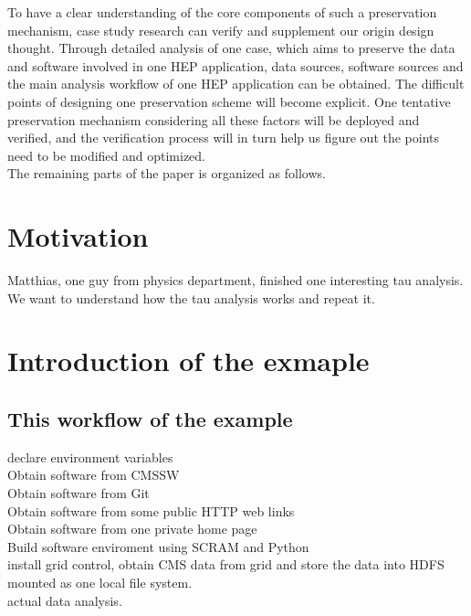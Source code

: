 \documentclass{article}
\begin{document}
To have a clear understanding of the core components of such a preservation mechanism, case study research can verify and supplement our origin design thought. Through detailed analysis of one case, which aims to preserve the data and software involved in one HEP application, data sources, software sources and the main analysis workflow of one HEP application can be obtained. The difficult points of designing one preservation scheme will become explicit. One tentative preservation mechanism considering all these factors will be deployed and verified, and the verification process will in turn help us figure out the points need to be modified and optimized.\\

The remaining parts of the paper is organized as follows. 

\section{Motivation}

\indent Matthias, one guy from physics department, finished one interesting tau analysis. We want to understand how the tau analysis works and repeat it. 

\section{Introduction of the exmaple}
\subsection{This workflow of the example}
\indent declare environment variables\\

Obtain software from CMSSW\\

Obtain software from Git\\

Obtain software from some public HTTP web links\\

Obtain software from one private home page\\

Build software enviroment using SCRAM and Python\\

install grid control, obtain CMS data from grid and store the data into HDFS mounted as one local file system.\\

actual data analysis.
\end{document}
